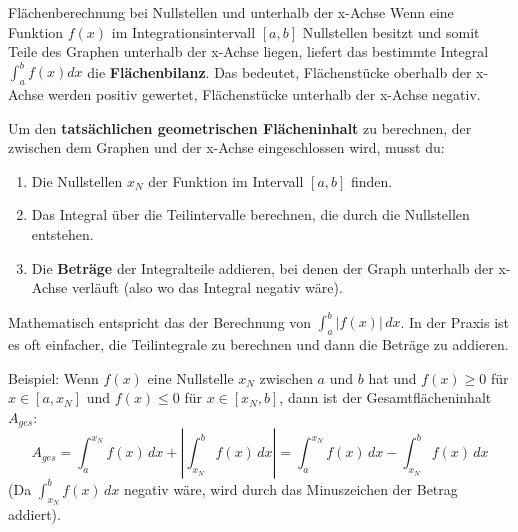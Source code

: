 \begin{infoboxumgebung}{Flächenberechnung bei Nullstellen und unterhalb der x-Achse}
Wenn eine Funktion $f(x)$ im Integrationsintervall $[a,b]$ Nullstellen besitzt und somit Teile des Graphen unterhalb der x-Achse liegen, liefert das bestimmte Integral $\int_a^b f(x)dx$ die \textbf{Flächenbilanz}. Das bedeutet, Flächenstücke oberhalb der x-Achse werden positiv gewertet, Flächenstücke unterhalb der x-Achse negativ.

Um den \textbf{tatsächlichen geometrischen Flächeninhalt} zu berechnen, der zwischen dem Graphen und der x-Achse eingeschlossen wird, musst du:
\begin{enumerate}
    \item Die Nullstellen $x_N$ der Funktion im Intervall $[a,b]$ finden.
    \item Das Integral über die Teilintervalle berechnen, die durch die Nullstellen entstehen.
    \item Die \textbf{Beträge} der Integralteile addieren, bei denen der Graph unterhalb der x-Achse verläuft (also wo das Integral negativ wäre).
\end{enumerate}
Mathematisch entspricht das der Berechnung von $\int_a^b |f(x)| \,dx$. In der Praxis ist es oft einfacher, die Teilintegrale zu berechnen und dann die Beträge zu addieren.

Beispiel: Wenn $f(x)$ eine Nullstelle $x_N$ zwischen $a$ und $b$ hat und $f(x) \ge 0$ für $x \in [a, x_N]$ und $f(x) \le 0$ für $x \in [x_N, b]$, dann ist der Gesamtflächeninhalt $A_{ges}$:
\[ A_{ges} = \int_a^{x_N} f(x) \,dx + \left| \int_{x_N}^b f(x) \,dx \right| = \int_a^{x_N} f(x) \,dx - \int_{x_N}^b f(x) \,dx \]
(Da $\int_{x_N}^b f(x) \,dx$ negativ wäre, wird durch das Minuszeichen der Betrag addiert).
\end{infoboxumgebung}

